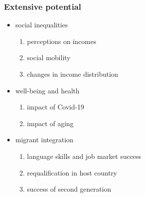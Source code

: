 \documentclass[10pt,english,dvipsnames,aspectratio=169,handout]{beamer}\usepackage[]{graphicx}\usepackage[]{xcolor}
\begin{document}
\begin{frame}
  \frametitle{Extensive potential}
  \begin{itemize}
    \item social inequalities
      \begin{enumerate}
        \item perceptions on incomes
        \item social mobility
        \item changes in income distribution
      \end{enumerate}
  \end{itemize}
  
  \pause
  
  \begin{itemize}
    \item well-being and health
      \begin{enumerate}
        \item impact of Covid-19
        \item impact of aging
      \end{enumerate}
  \end{itemize}
  
  \pause
  
  \begin{itemize}
    \item migrant integration
      \begin{enumerate}
        \item language skills and job market success
        \item requalification in host country
        \item success of second generation
      \end{enumerate}
  \end{itemize}  
  
\end{frame}
\end{document}
